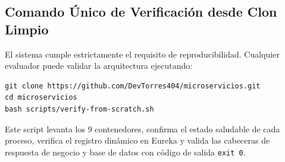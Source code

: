 \documentclass[12pt,a4paper]{article}
\begin{document}
\subsection{Comando \'{U}nico de Verificaci\'{o}n desde Clon Limpio}
El sistema cumple estrictamente el requisito de reproducibilidad. Cualquier evaluador puede validar la arquitectura ejecutando:
\begin{verbatim}
git clone https://github.com/DevTorres404/microservicios.git
cd microservicios
bash scripts/verify-from-scratch.sh
\end{verbatim}
Este script levanta los 9 contenedores, confirma el estado saludable de cada proceso, verifica el registro din\'{a}mico en Eureka y valida las cabeceras de respuesta de negocio y base de datos con c\'{o}digo de salida \texttt{exit 0}.
\end{document}
